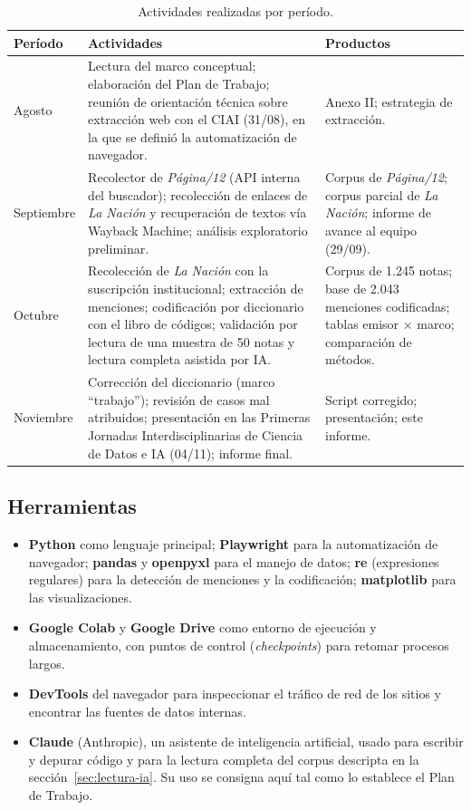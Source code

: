 \documentclass[11pt,a4paper]{article}
\newcommand{\pdoce}{\textit{Página/12}}
\newcommand{\lanac}{\textit{La Nación}}
\begin{document}
\begin{table}[h]
\centering\small
\caption{Actividades realizadas por período.}
\label{tab:cronograma}
\begin{tabularx}{\linewidth}{>{\raggedright}p{2.6cm} X >{\raggedright\arraybackslash}p{4.2cm}}
\toprule
\textbf{Período} & \textbf{Actividades} & \textbf{Productos} \\
\midrule
Agosto & Lectura del marco conceptual; elaboración del Plan de Trabajo; reunión de orientación técnica sobre extracción web con el CIAI (31/08), en la que se definió la automatización de navegador. & Anexo II; estrategia de extracción. \\
Septiembre & Recolector de \pdoce{} (API interna del buscador); recolección de enlaces de \lanac{} y recuperación de textos vía Wayback Machine; análisis exploratorio preliminar. & Corpus de \pdoce{}; corpus parcial de \lanac{}; informe de avance al equipo (29/09). \\
Octubre & Recolección de \lanac{} con la suscripción institucional; extracción de menciones; codificación por diccionario con el libro de códigos; validación por lectura de una muestra de 50 notas y lectura completa asistida por IA. & Corpus de 1.245 notas; base de 2.043 menciones codificadas; tablas emisor $\times$ marco; comparación de métodos. \\
Noviembre & Corrección del diccionario (marco \enquote{trabajo}); revisión de casos mal atribuidos; presentación en las Primeras Jornadas Interdisciplinarias de Ciencia de Datos e IA (04/11); informe final. & Script corregido; presentación; este informe. \\
\bottomrule
\end{tabularx}
\end{table}

\subsection{Herramientas}

\begin{itemize}
  \item \textbf{Python} como lenguaje principal; \textbf{Playwright} para la automatización de navegador; \textbf{pandas} y \textbf{openpyxl} para el manejo de datos; \textbf{re} (expresiones regulares) para la detección de menciones y la codificación; \textbf{matplotlib} para las visualizaciones.
  \item \textbf{Google Colab} y \textbf{Google Drive} como entorno de ejecución y almacenamiento, con puntos de control (\textit{checkpoints}) para retomar procesos largos.
  \item \textbf{DevTools} del navegador para inspeccionar el tráfico de red de los sitios y encontrar las fuentes de datos internas.
  \item \textbf{Claude} (Anthropic), un asistente de inteligencia artificial, usado para escribir y depurar código y para la lectura completa del corpus descripta en la sección~\ref{sec:lectura-ia}. Su uso se consigna aquí tal como lo establece el Plan de Trabajo.
\end{itemize}
\end{document}
